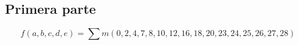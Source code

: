 \subsection{Primera parte}

\begin{displaymath}
f(a,b,c,d,e) = \sum{m(0,2,4,7,8,10,12,16,18,20,23,24,25,26,27,28)}
\end{displaymath}